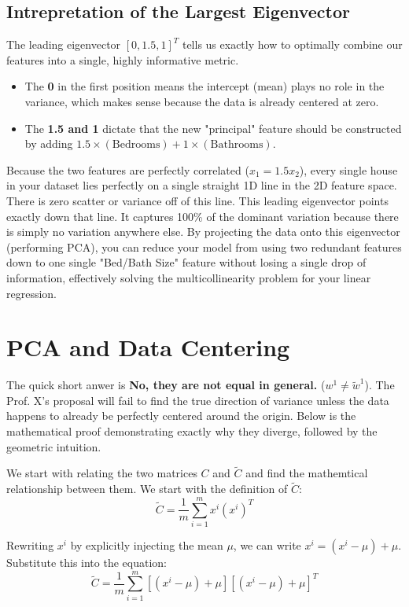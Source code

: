 \documentclass[twoside, 10pt]{article}
\begin{document}
\subsection{Intrepretation of the Largest Eigenvector}
The leading eigenvector $[0, 1.5, 1]^T$ tells us exactly how to optimally combine our features into a single, highly informative metric.
\begin{itemize}
    \item The \textbf{0} in the first position means the intercept (mean) plays no role in the variance, which makes sense because the data is already centered at zero.
    \item The \textbf{1.5 and 1} dictate that the new "principal" feature should be constructed by adding $1.5 \times (\text{Bedrooms}) + 1 \times (\text{Bathrooms})$.
\end{itemize}
Because the two features are perfectly correlated ($x_1 = 1.5x_2$), every single house in your dataset lies perfectly on a single straight 1D line in the 2D feature space. There is zero scatter or variance off of this line. 
This leading eigenvector points exactly down that line. It captures 100\% of the dominant variation because there is simply no variation anywhere else. By projecting the data onto this eigenvector (performing PCA), you can reduce your model from using two redundant features down to one single "Bed/Bath Size" feature without losing a single drop of information, effectively solving the multicollinearity problem for your linear regression.

\section{PCA and Data Centering} %

The quick short anwer is \textbf{No, they are not equal in general.} ($w^1 \neq \tilde{w}^1$). The Prof. X's proposal will fail to find the true direction of variance unless the data happens to already be perfectly centered around the origin. Below is the mathematical proof demonstrating exactly why they diverge, followed by the geometric intuition.

We start with relating the two matrices $C$ and $\tilde{C}$ and find the mathemtical relationship between them. We start with the definition of $\tilde{C}$:
\[ \tilde{C} = \frac{1}{m} \sum_{i=1}^m x^i (x^i)^T \]

Rewriting $x^i$ by explicitly injecting the mean $\mu$, we can write $x^i = (x^i - \mu) + \mu$. Substitute this into the equation:
\[ \tilde{C} = \frac{1}{m} \sum_{i=1}^m \left[ (x^i - \mu) + \mu \right] \left[ (x^i - \mu) + \mu \right]^T \]
\end{document}

